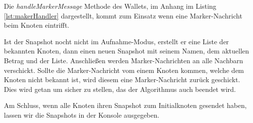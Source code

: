 Die \textit{handleMarkerMessage} Methode des Wallets, im Anhang im Listing 
\ref{lst:makerHandler} dargestellt, kommt zum Einsatz wenn eine Marker-Nachricht
beim Knoten eintrifft.

Ist der Snapshot nocht nicht im Aufnahme-Modus, erstellt er eine Liste der
bekannten Knoten, dann einen neuen Snapshot mit seinem Namen, dem aktuellen
Betrag und der Liste. Anschließen werden Marker-Nachrichten an alle Nachbarn
verschickt.
Sollte die Marker-Nachricht vom einem Knoten kommen, welche dem Knoten nicht
bekannt ist, wird diesem eine Marker-Nachricht zurück geschickt.
Dies wird getan um sicher zu stellen, das der Algorithmus auch beendet wird.

Am Schluss, wenn alle Knoten ihren Snapshot zum Initialknoten gesendet haben,
lassen wir die Snapshots in der Konsole ausgegeben.

